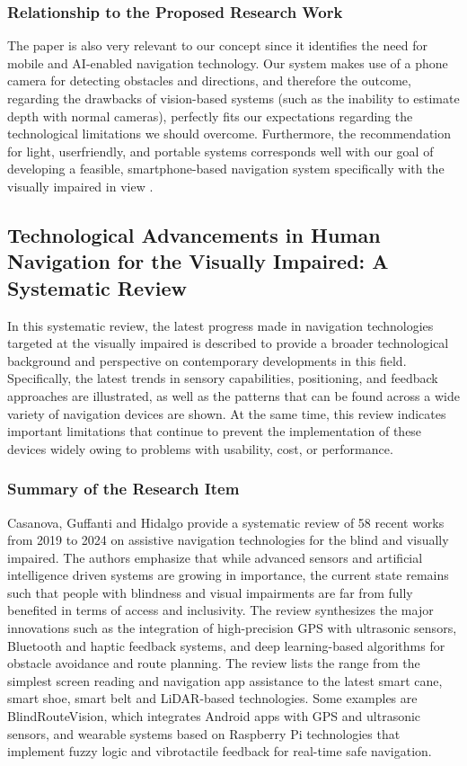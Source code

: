 \documentclass{FastFyp}
\begin{document}
\subsubsection{Relationship to the Proposed Research Work}  
The paper is also very relevant to our concept since it identifies the need for mobile and AI-enabled navigation technology. Our system makes use of a phone camera for detecting obstacles and directions, and therefore the outcome, regarding the drawbacks of vision-based systems (such as the inability to estimate depth with normal cameras), perfectly fits our expectations regarding the technological limitations we should overcome. Furthermore, the recommendation for light, userfriendly, and portable systems corresponds well with our goal of developing a feasible, smartphone-based navigation system specifically with the visually impaired in view \cite{ref:okolo2024assistive}.

\subsection{Technological Advancements in Human Navigation for the Visually Impaired: A Systematic Review}
In this systematic review, the latest progress made in navigation technologies targeted at the visually impaired is described to provide a broader technological background and perspective on contemporary developments in this field. Specifically, the latest trends in sensory capabilities, positioning, and feedback approaches are illustrated, as well as the patterns that can be found across a wide variety of navigation devices are shown. At the same time, this review indicates important limitations that continue to prevent the implementation of these devices widely owing to problems with usability, cost, or performance.

 \subsubsection{Summary of the Research Item}
Casanova, Guffanti and Hidalgo \cite{ref:casanova2025technological} provide a systematic review of 58 recent works from 2019 to 2024 on assistive navigation technologies for the blind and visually impaired. The authors emphasize that while advanced sensors and artificial intelligence driven systems are growing in importance, the current state remains such that people with blindness and visual impairments are far from fully benefited in terms of access and inclusivity. The review synthesizes the major innovations such as the integration of high-precision GPS with ultrasonic sensors, Bluetooth and haptic feedback systems, and deep learning-based algorithms for obstacle avoidance and route planning. The review lists the range from the simplest screen reading and navigation app assistance to the latest smart cane, smart shoe, smart belt and LiDAR-based technologies. Some examples are BlindRouteVision, which integrates Android apps with GPS and ultrasonic sensors, and wearable systems based on Raspberry Pi technologies that implement fuzzy logic and vibrotactile feedback for real-time safe navigation.
\end{document}
